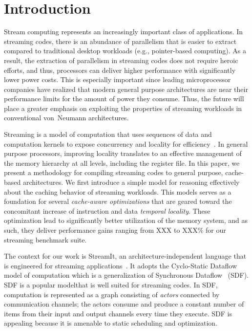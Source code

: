 \section{Introduction}


Stream computing represents an increasingly important class of
applications. In streaming codes, there is an abundance of parallelism that
is easier to extract compared to traditional desktop workloads (e.g.,
pointer-based computing). As a result, the extraction of parallelism
in streaming codes does not require heroic efforts, and thus,
processors can deliver higher performance with significantly lower
power costs. This is especially important since
leading microprocessor companies have realized that modern general
purpose architectures are near their  performance limits for  the
amount of power they consume. Thus, the future will place a greater
emphasis on exploiting the properties of streaming workloads in
conventional von~Neumann architectures.

Streaming is a model of computation that uses sequences of data
and computation kernels to expose concurrency and locality for
efficiency~\cite{wss}. In general purpose processors, improving locality 
translates to an effective management of the memory hierarchy at all
levels, including the register file. In this paper, we present a
methodology for compiling streaming codes to general purpose,
cache-based architectures. We first introduce a simple model for
reasoning effectively about the caching behavior of streaming
workloads. This models serves as a foundation for several {\it cache-aware
optimizations} that are geared toward the concomitant increase of instruction
and data {\it temporal locality}. These
optimization lead to significantly better utilization of the memory
system, and as such, they deliver performance gains ranging from XXX
to XXX\% for our streaming benchmark suite.

The context for our work is StreamIt, an architecture-independent
language that is engineered for streaming
applications~\cite{streamit}. It adopts the 
Cyclo-Static Dataflow~\cite{BELP96} model of computation which is a
generalization of Synchronous Dataflow~\cite{LM87-i} (SDF).  
SDF is a popular  modelthat  is well suited for
streaming codes. In SDF, computation is represented as a graph
consisting of {\it  actors} connected by communication channels; the
actors consume  and produce a constant number  of items from their
input and output  channels every time they execute. SDF is appealing
because it is amenable to static scheduling and optimization. 


